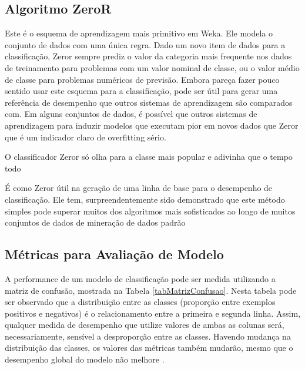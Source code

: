\documentclass[
	12pt,				%
	openright,			%
	oneside,	
	a4paper,				%
	english,				%
	brazil				%
]{abntex2/abntex2} %
\begin{document}
	\subsection{Algoritmo ZeroR}
	
	 Este é o esquema de aprendizagem mais primitivo em Weka. Ele modela o conjunto de dados com uma única regra. Dado um novo item de dados para a classificação, Zeror sempre prediz o valor da categoria mais frequente nos dados de treinamento para problemas com um valor nominal de classe, ou o valor médio de classe para problemas numéricos de previsão. Embora pareça fazer pouco sentido usar este esquema para a classificação, pode ser útil para gerar uma referência de desempenho que outros sistemas de aprendizagem são comparados com. Em alguns conjuntos de dados, é possível que outros sistemas de aprendizagem para induzir modelos que executam pior em novos dados que Zeror que é um indicador claro de overfitting sério.
	 
	 O classificador Zeror só olha para a classe mais popular e adivinha que o tempo todo
	 
	 É como Zeror útil na geração de uma linha de base para o desempenho de classificação. Ele tem, surpreendentemente sido demonstrado que este método simples pode superar muitos dos algoritmos mais sofisticados ao longo de muitos conjuntos de dados de mineração de dados padrão \cite{witten:2011}
	 
	
	\subsection{Métricas para Avaliação de Modelo}
	
	A performance de um modelo de classificação pode ser medida utilizando a matriz de confusão, mostrada na Tabela \ref{tabMatrizConfusao}. Nesta tabela pode ser observado que a distribuição entre as classes (proporção entre exemplos positivos e negativos) é o relacionamento entre a primeira e segunda linha. Assim, qualquer medida de desempenho que utilize valores de ambas as colunas será, necessariamente, sensível a desproporção entre as classes. Havendo mudança na distribuição das classes, os valores das métricas também mudarão, mesmo que o desempenho global do modelo não melhore \cite{prati:2008}.
	\\
	
\end{document}
